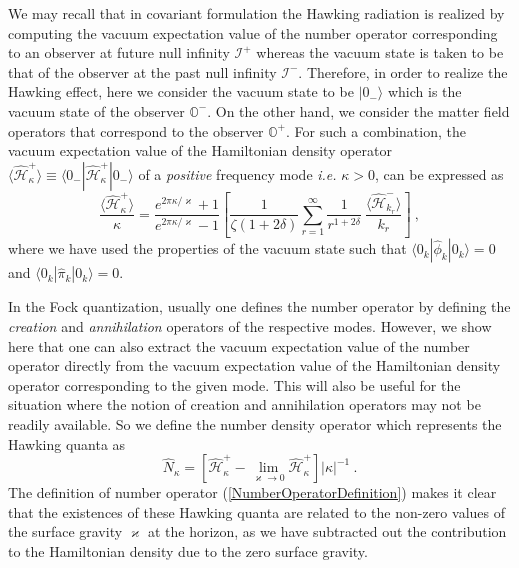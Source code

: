 \documentclass[aps,12pt,showpacs]{revtex4-2}
\def\kr{\kappa}
\def\ksg{\mathrm{\varkappa}}
\def\scriplus{\mathscr{I}^{+}}
\def\scriminus{\mathscr{I}^{-}}
\def\observerminus{\mathbb{O}^{-}}
\def\observerplus{\mathbb{O}^{+}}
\begin{document}
We may recall that in covariant formulation the Hawking radiation is realized 
by computing the vacuum expectation value of the number operator corresponding 
to an observer at future null infinity $\scriplus$ whereas the vacuum state is 
taken to be that of the observer at the past null infinity $\scriminus$. 
Therefore, in order to realize the Hawking effect, here we consider the vacuum 
state to be $|0_{-}\rangle$ which is the vacuum state of the observer 
$\observerminus$. On the other hand, we consider the matter field operators 
that correspond to the observer $\observerplus$. For such a combination, the 
vacuum expectation value of the Hamiltonian density operator $\langle  
\hat{\mathcal{H}}_{\kr}^{+} \rangle \equiv \langle 0_{-}| 
\hat{\mathcal{H}}_{\kr}^{+} |0_{-}\rangle$ of a \emph{positive} frequency mode 
\emph{i.e.} $\kr>0$, can be expressed as
%
\begin{equation}\label{HamiltonianPlusVEV}
\frac{\langle\hat{\mathcal{H}}_{\kr}^{+}\rangle}{\kr} =
\frac{e^{2\pi\kr/\ksg} + 1}{e^{2\pi\kr/\ksg} - 1} 
\left[ \frac{1}{\zeta(1+2\delta)}
\sum_{r=1}^{\infty} \frac{1}{r^{1+2\delta}} ~
\frac{\langle\hat{\mathcal{H}}_{k_r}^{-}\rangle}{k_r}
\right]
~,
\end{equation}
%
where we have used the properties of the vacuum state such that $\langle 
0_k|\hat{\phi}_{k} |0_k\rangle = 0$ and $\langle 0_k|\hat{\pi}_{k} |0_k\rangle = 
0$. 

In the Fock quantization, usually one defines the number operator by defining 
the \emph{creation} and \emph{annihilation} operators of the respective modes.
However, we show here that one can also extract the vacuum expectation 
value of the number operator directly from the vacuum expectation value of the 
Hamiltonian density operator corresponding to the given mode. This will also be 
useful for the situation where the notion of creation and annihilation operators 
may not be readily available. So we define the number density operator which 
represents the Hawking quanta as
%
\begin{equation}\label{NumberOperatorDefinition}
\hat{N}_{\kr} = \left[ 
\hat{\mathcal{H}}_{\kr}^{+} - \lim_{\ksg\to0} \hat{\mathcal{H}}_{\kr}^{+} 
\right] |\kr|^{-1}  ~.
\end{equation}
% 
The definition of number operator (\ref{NumberOperatorDefinition}) makes it 
clear that the existences of these Hawking quanta are related to the non-zero 
values of the surface gravity $\ksg$ at the horizon, as we have subtracted out 
the contribution to the Hamiltonian density due to the zero surface gravity.
\end{document}
